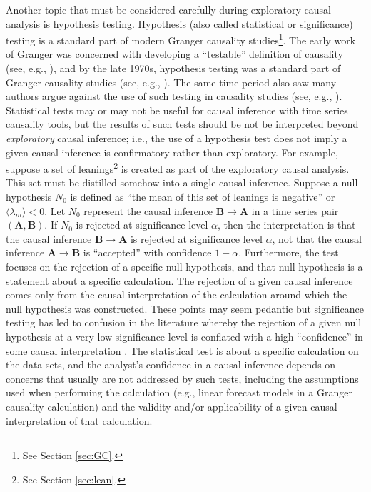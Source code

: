 \documentclass{article}[10pt]
\begin{document}
Another topic that must be considered carefully during exploratory causal analysis is hypothesis testing.  Hypothesis (also called statistical or significance) testing is a standard part of modern Granger causality studies\footnote{See Section \ref{sec:GC}.}.  The early work of Granger was concerned with developing a ``testable'' definition of causality (see, e.g., \cite{Granger1963,Granger1969}), and by the late 1970s, hypothesis testing was a standard part of Granger causality studies (see, e.g., \cite{Pierce1977}).  The same time period also saw many authors argue against the use of such testing in causality studies (see, e.g., \cite{Schwert1979,Jacobs1979}).  Statistical tests may or may not be useful for causal inference with time series causality tools, but the results of such tests should be not be interpreted beyond {\em exploratory} causal inference; i.e., the use of a hypothesis test does not imply a given causal inference is confirmatory rather than exploratory.  For example, suppose a set of leanings\footnote{See Section \ref{sec:lean}.} is created as part of the exploratory causal analysis.  This set must be distilled somehow into a single causal inference.  Suppose a null hypothesis $N_0$ is defined as ``the mean of this set of leanings is negative'' or $\langle \lambda_m \rangle < 0$.  Let $N_0$ represent the causal inference $\mathbf{B}\rightarrow\mathbf{A}$ in a time series pair $(\mathbf{A},\mathbf{B})$.  If $N_0$ is rejected at significance level $\alpha$, then the interpretation is that the causal inference $\mathbf{B}\rightarrow\mathbf{A}$ is rejected at significance level $\alpha$, not that the causal inference $\mathbf{A}\rightarrow\mathbf{B}$ is ``accepted'' with confidence $1-\alpha$.  Furthermore, the test focuses on the rejection of a specific null hypothesis, and that null hypothesis is a statement about a specific calculation.  The rejection of a given causal inference comes only from the causal interpretation of the calculation around which the null hypothesis was constructed.  These points may seem pedantic but significance testing has led to confusion in the literature whereby the rejection of a given null hypothesis at a very low significance level is conflated with a high ``confidence'' in some causal interpretation \cite{Schwert1979,Jacobs1979}.  The statistical test is about a specific calculation on the data sets, and the analyst's confidence in a causal inference depends on concerns that usually are not addressed by such tests, including the assumptions used when performing the calculation (e.g., linear forecast models in a Granger causality calculation) and the validity and/or applicability of a given causal interpretation of that calculation. 
\end{document}
